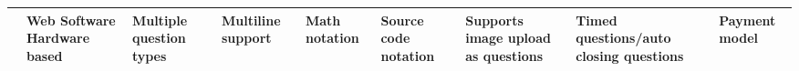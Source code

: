 

\begin{landscape}
    \begin{center}
        \begin{table}[H]
            \begin{tabularx}{\paperwidth}{ |X|X|X|X|X|X|X|X|X| } 
             \hline
                 & Web \newline Software \newline Hardware based & Multiple question types & Multiline support & Math notation & Source code notation & Supports image upload as questions & Timed questions/auto closing questions & Payment model \\ \hline
                 

\end{tabularx}
\end{table}
\end{center}
\end{landscape}
